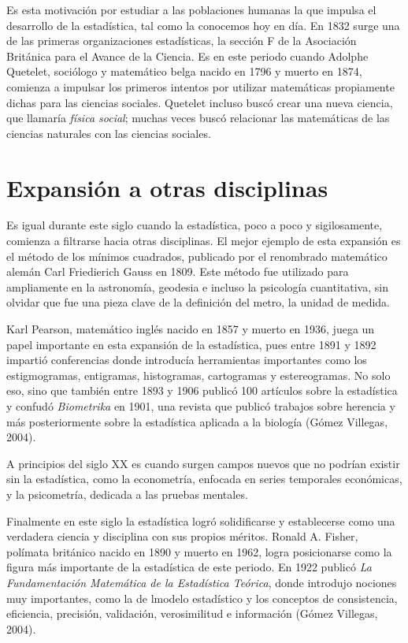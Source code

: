 \documentclass[12pt, a4paper]{article}
\begin{document}
Es esta motivación por estudiar a las poblaciones humanas la que impulsa el desarrollo de la estadística, tal como la conocemos hoy en día. En 1832 surge una de las primeras organizaciones estadísticas, la sección F de la Asociación Británica para el Avance de la Ciencia. Es en este periodo cuando Adolphe Quetelet, sociólogo y matemático belga nacido en 1796 y muerto en 1874, comienza a impulsar los primeros intentos por utilizar matemáticas propiamente dichas para las ciencias sociales. Quetelet incluso buscó crear una nueva ciencia, que llamaría \textit{física social}; muchas veces buscó relacionar las matemáticas de las ciencias naturales con las ciencias sociales.

\section{Expansión a otras disciplinas}

Es igual durante este siglo cuando la estadística, poco a poco y sigilosamente, comienza a filtrarse hacia otras disciplinas. El mejor ejemplo de esta expansión es el método de los mínimos cuadrados, publicado por el renombrado matemático alemán Carl Friedierich Gauss en 1809. Este método fue utilizado para ampliamente en la astronomía, geodesia e incluso la psicología cuantitativa, sin olvidar que fue una pieza clave de la definición del metro, la unidad de medida.

Karl Pearson, matemático inglés nacido en 1857 y muerto en 1936, juega un papel importante en esta expansión de la estadística, pues entre 1891 y 1892 impartió conferencias donde introducía herramientas importantes como los estigmogramas, entigramas, histogramas, cartogramas y estereogramas. No solo eso, sino que también entre 1893 y 1906 publicó 100 artículos sobre la estadística y confudó \textit{Biometrika} en 1901, una revista que publicó trabajos sobre herencia y más posteriormente sobre la estadística aplicada a la biología (Gómez Villegas, 2004).

A principios del siglo XX es cuando surgen campos nuevos que no podrían existir sin la estadística, como la econometría, enfocada en series temporales económicas, y la psicometría, dedicada a las pruebas mentales.

Finalmente en este siglo la estadística logró solidificarse y establecerse como una verdadera ciencia y disciplina con sus propios méritos. Ronald A. Fisher, polímata británico nacido en 1890 y muerto en 1962, logra posicionarse como la figura más importante de la estadística de este periodo. En 1922 publicó \textit{La Fundamentación Matemática de la Estadística Teórica}, donde introdujo nociones muy importantes, como la de lmodelo estadístico y los conceptos de consistencia, eficiencia, precisión, validación, verosimilitud e información (Gómez Villegas, 2004).
\end{document}
